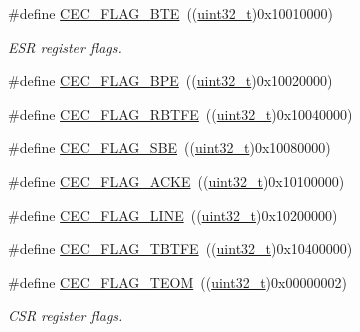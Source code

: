 \begin{DoxyCompactItemize}
\item 
\#define \hyperlink{group___c_e_c__flags__definition_ga66e91438a7df5d00db3c5410d8f7d456}{C\+E\+C\+\_\+\+F\+L\+A\+G\+\_\+\+B\+TE}~((\hyperlink{_p_e___types_8h_a33594304e786b158f3fb30289278f5af}{uint32\+\_\+t})0x10010000)
\begin{DoxyCompactList}\small\item\em E\+SR register flags. \end{DoxyCompactList}\item 
\#define \hyperlink{group___c_e_c__flags__definition_gaf2a5d5dcbc57fc0cf7cfa988533a2a09}{C\+E\+C\+\_\+\+F\+L\+A\+G\+\_\+\+B\+PE}~((\hyperlink{_p_e___types_8h_a33594304e786b158f3fb30289278f5af}{uint32\+\_\+t})0x10020000)
\item 
\#define \hyperlink{group___c_e_c__flags__definition_gafdfca815014dee4a458083337795c336}{C\+E\+C\+\_\+\+F\+L\+A\+G\+\_\+\+R\+B\+T\+FE}~((\hyperlink{_p_e___types_8h_a33594304e786b158f3fb30289278f5af}{uint32\+\_\+t})0x10040000)
\item 
\#define \hyperlink{group___c_e_c__flags__definition_gac77db62c05af2462ed3f1b64cef2e136}{C\+E\+C\+\_\+\+F\+L\+A\+G\+\_\+\+S\+BE}~((\hyperlink{_p_e___types_8h_a33594304e786b158f3fb30289278f5af}{uint32\+\_\+t})0x10080000)
\item 
\#define \hyperlink{group___c_e_c__flags__definition_ga1583b7a221e54f2f19cb121bf310547c}{C\+E\+C\+\_\+\+F\+L\+A\+G\+\_\+\+A\+C\+KE}~((\hyperlink{_p_e___types_8h_a33594304e786b158f3fb30289278f5af}{uint32\+\_\+t})0x10100000)
\item 
\#define \hyperlink{group___c_e_c__flags__definition_gaf751970725df12976dc6c8356910143a}{C\+E\+C\+\_\+\+F\+L\+A\+G\+\_\+\+L\+I\+NE}~((\hyperlink{_p_e___types_8h_a33594304e786b158f3fb30289278f5af}{uint32\+\_\+t})0x10200000)
\item 
\#define \hyperlink{group___c_e_c__flags__definition_gaae90fd2f95085e113b6943bb35d899ba}{C\+E\+C\+\_\+\+F\+L\+A\+G\+\_\+\+T\+B\+T\+FE}~((\hyperlink{_p_e___types_8h_a33594304e786b158f3fb30289278f5af}{uint32\+\_\+t})0x10400000)
\item 
\#define \hyperlink{group___c_e_c__flags__definition_gad0adfb11294f562f2c8dc555f69e25e0}{C\+E\+C\+\_\+\+F\+L\+A\+G\+\_\+\+T\+E\+OM}~((\hyperlink{_p_e___types_8h_a33594304e786b158f3fb30289278f5af}{uint32\+\_\+t})0x00000002)
\begin{DoxyCompactList}\small\item\em C\+SR register flags. \end{DoxyCompactList}\item 

\end{DoxyCompactItemize}

